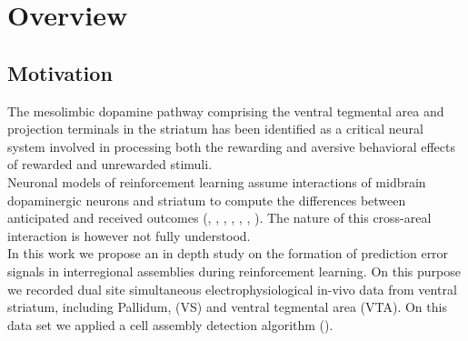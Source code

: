\chapter{Overview}
\label{chap:Overview}
\section{Motivation}
\label{sec:Motivation}
The mesolimbic dopamine pathway comprising the ventral tegmental area and projection terminals in the striatum has been identified as a critical neural system involved in processing both the rewarding and aversive behavioral effects of rewarded and unrewarded stimuli.\\Neuronal models of reinforcement learning assume interactions of midbrain dopaminergic neurons and striatum to compute the differences between anticipated and received outcomes (\cite{Schultz2001}, \cite{Schultz2002}, \cite{Fiorillo}, \cite{Eshel1}, \cite{Pagnoni}, \cite{Radua}, \cite{Takahashi2016}). The nature of this cross-areal interaction is however not fully understood.\\In this work we propose an in depth study on the formation of prediction error signals in interregional assemblies during reinforcement learning. On this purpose we recorded dual site simultaneous electrophysiological in-vivo data from ventral striatum, including Pallidum, (VS) and ventral tegmental area (VTA). On this data set we applied a cell assembly detection algorithm (\cite{RussoDurstewitz}).
